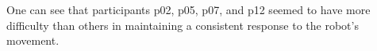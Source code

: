 \documentclass[a0paper,portrait]{baposter}
\begin{document}
\begin{poster}
{One  can see that participants p02, p05, p07, and p12 seemed
to have more difficulty than others in maintaining a consistent response
to the robot's movement.

% 


\begin{center}

\end{center}}
\end{poster}
\end{document}
